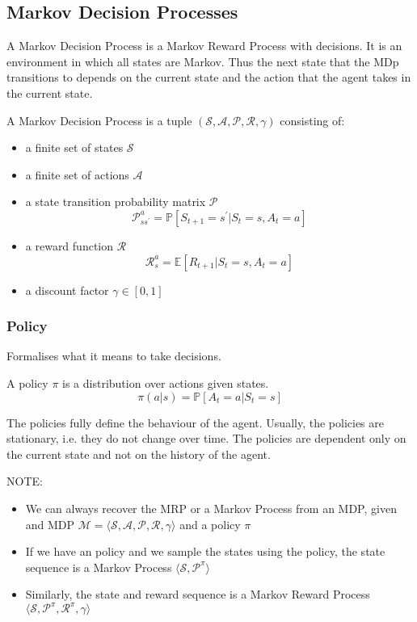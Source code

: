 \subsection{Markov Decision Processes}
A Markov Decision Process is a Markov Reward Process with decisions.
It is an environment in which all states are Markov. Thus the next state
that the MDp transitions to depends on the current state and the action
that the agent takes in the current state.

\begin{definition}
    A Markov Decision Process is a tuple \((\mathcal{S}, \mathcal{A} , \mathcal{P} , \mathcal{R} , \gamma)\)
    consisting of:
    \begin{itemize}
        \item a finite set of states \(\mathcal{S} \)
        \item a finite set of actions \(\mathcal{A} \)
        \item a state transition probability matrix \(\mathcal{P} \)
        \[
            \mathcal{P} _{ss^{\prime}}^{a} = \mathbb{P}  [S_{t+1} = s^{\prime} | S_{t} = s, A_{t} = a]  
        \]
        \item a reward function \(\mathcal{R} \)
        \[
            \mathcal{R} _{s}^{a} = \mathbb{E}  [R_{t+1} | S_{t} = s, A_{t} = a]  
        \]
        \item a discount factor \(\gamma \in [0, 1]\)
    \end{itemize}
\end{definition}
\subsubsection{Policy}
Formalises what it means to take decisions. 
\begin{definition}[Policy]
    A policy \(\pi \) is a distribution over actions given states.
    \[
        \pi (a|s) = \mathbb{P}  [A_{t} = a | S_{t} = s]  
    \]
\end{definition}
The policies fully define the behaviour of the agent. Usually,
the policies are stationary, i.e. they do not change over time.
The policies are dependent only on the current state and not on the
history of the agent.

NOTE: 
\begin{itemize}
    \item We can always recover the MRP or a Markov Process from an MDP, given
    and MDP \(\mathcal{M} = \langle \mathcal{S}, \mathcal{A} , 
    \mathcal{P} , \mathcal{R} , \gamma \rangle
    \)
    and a policy \(\pi\)
    \item If we have an policy and we sample the states using the policy,
    the state sequence is a Markov Process \( \langle \mathcal{S}, \mathcal{P} ^{\pi} \rangle \)
    
    \item Similarly, the state and reward sequence is a Markov Reward Process \( 
        \langle \mathcal{S}, \mathcal{P} ^{\pi}, \mathcal{R} ^{\pi}, \gamma \rangle \) 
\end{itemize}
